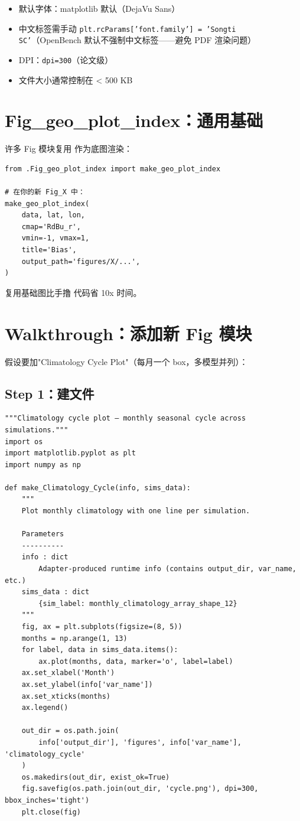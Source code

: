 \begin{itemize}
  \item 默认字体：matplotlib 默认（DejaVu Sans）
  \item 中文标签需手动 \texttt{plt.rcParams['font.family'] = 'Songti SC'}（OpenBench 默认不强制中文标签——避免 PDF 渲染问题）
  \item DPI：\texttt{dpi=300}（论文级）
  \item 文件大小通常控制在 < 500 KB
\end{itemize}

\section{Fig\_geo\_plot\_index：通用基础}

许多 Fig 模块复用  作为底图渲染：

\begin{verbatim}
from .Fig_geo_plot_index import make_geo_plot_index

# 在你的新 Fig_X 中：
make_geo_plot_index(
    data, lat, lon,
    cmap='RdBu_r',
    vmin=-1, vmax=1,
    title='Bias',
    output_path='figures/X/...',
)
\end{verbatim}

复用基础图比手撸  代码省 10x 时间。

\section{Walkthrough：添加新 Fig 模块}

假设要加"Climatology Cycle Plot"（每月一个 box，多模型并列）：

\subsection{Step 1：建文件 }

\begin{verbatim}
"""Climatology cycle plot — monthly seasonal cycle across simulations."""
import os
import matplotlib.pyplot as plt
import numpy as np

def make_Climatology_Cycle(info, sims_data):
    """
    Plot monthly climatology with one line per simulation.

    Parameters
    ----------
    info : dict
        Adapter-produced runtime info (contains output_dir, var_name, etc.)
    sims_data : dict
        {sim_label: monthly_climatology_array_shape_12}
    """
    fig, ax = plt.subplots(figsize=(8, 5))
    months = np.arange(1, 13)
    for label, data in sims_data.items():
        ax.plot(months, data, marker='o', label=label)
    ax.set_xlabel('Month')
    ax.set_ylabel(info['var_name'])
    ax.set_xticks(months)
    ax.legend()

    out_dir = os.path.join(
        info['output_dir'], 'figures', info['var_name'], 'climatology_cycle'
    )
    os.makedirs(out_dir, exist_ok=True)
    fig.savefig(os.path.join(out_dir, 'cycle.png'), dpi=300, bbox_inches='tight')
    plt.close(fig)
\end{verbatim}

